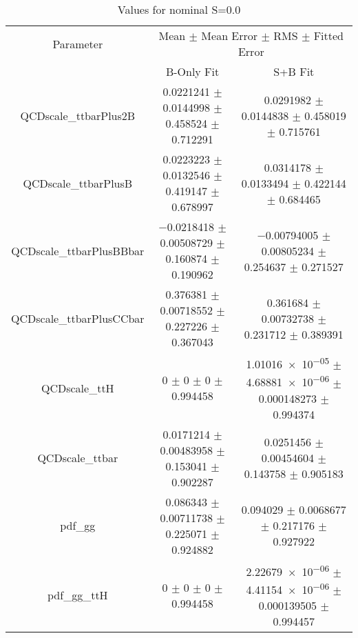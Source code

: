 \begin{table}
\centering
\caption{Values for nominal S=0.0}
\begin{tabular}{ccc}
\toprule
Parameter & \multicolumn{2}{c}{Mean $\pm$ Mean Error $\pm$ RMS $\pm$ Fitted Error}\\
 & B-Only Fit & S+B Fit\\
\midrule
QCDscale\_ttbarPlus2B & \num{0.0221241} $\pm$ \num{0.0144998} $\pm$ \num{0.458524} $\pm$ \num{0.712291} & \num{0.0291982} $\pm$ \num{0.0144838} $\pm$ \num{0.458019} $\pm$ \num{0.715761}\\
QCDscale\_ttbarPlusB & \num{0.0223223} $\pm$ \num{0.0132546} $\pm$ \num{0.419147} $\pm$ \num{0.678997} & \num{0.0314178} $\pm$ \num{0.0133494} $\pm$ \num{0.422144} $\pm$ \num{0.684465}\\
QCDscale\_ttbarPlusBBbar & \num{-0.0218418} $\pm$ \num{0.00508729} $\pm$ \num{0.160874} $\pm$ \num{0.190962} & \num{-0.00794005} $\pm$ \num{0.00805234} $\pm$ \num{0.254637} $\pm$ \num{0.271527}\\
QCDscale\_ttbarPlusCCbar & \num{0.376381} $\pm$ \num{0.00718552} $\pm$ \num{0.227226} $\pm$ \num{0.367043} & \num{0.361684} $\pm$ \num{0.00732738} $\pm$ \num{0.231712} $\pm$ \num{0.389391}\\
QCDscale\_ttH & \num{0} $\pm$ \num{0} $\pm$ \num{0} $\pm$ \num{0.994458} & \num{1.01016e-05} $\pm$ \num{4.68881e-06} $\pm$ \num{0.000148273} $\pm$ \num{0.994374}\\
QCDscale\_ttbar & \num{0.0171214} $\pm$ \num{0.00483958} $\pm$ \num{0.153041} $\pm$ \num{0.902287} & \num{0.0251456} $\pm$ \num{0.00454604} $\pm$ \num{0.143758} $\pm$ \num{0.905183}\\
pdf\_gg & \num{0.086343} $\pm$ \num{0.00711738} $\pm$ \num{0.225071} $\pm$ \num{0.924882} & \num{0.094029} $\pm$ \num{0.0068677} $\pm$ \num{0.217176} $\pm$ \num{0.927922}\\
pdf\_gg\_ttH & \num{0} $\pm$ \num{0} $\pm$ \num{0} $\pm$ \num{0.994458} & \num{2.22679e-06} $\pm$ \num{4.41154e-06} $\pm$ \num{0.000139505} $\pm$ \num{0.994457}\\
\bottomrule
\end{tabular}
\end{table}
